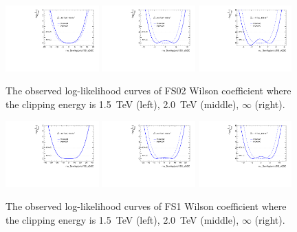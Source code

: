 \begin{figure}[ht]
    \centering
    \includegraphics[width=0.32\textwidth]{figures/aQGC/profileFS021500}
    	\includegraphics[width=0.32\textwidth]{figures/aQGC/profileFS022000}
        \includegraphics[width=0.32\textwidth]{figures/aQGC/profileFS02inf}
        \caption{The observed log-likelihood curves of FS02 Wilson coefficient where the clipping energy is 1.5~TeV (left), 2.0~TeV (middle), $\infty$ (right).}
        \label{fig:ProfileLLFS02}
\end{figure}
\begin{figure}[ht]
    \centering
    \includegraphics[width=0.32\textwidth]{figures/aQGC/profileFS11500}
    	\includegraphics[width=0.32\textwidth]{figures/aQGC/profileFS12000}
        \includegraphics[width=0.32\textwidth]{figures/aQGC/profileFS1inf}
        \caption{The observed log-likelihood curves of FS1 Wilson coefficient where the clipping energy is 1.5~TeV (left), 2.0~TeV (middle), $\infty$ (right).}
        \label{fig:ProfileLLFS1}
\end{figure}

